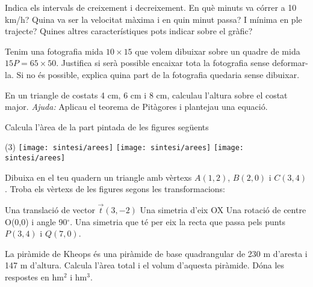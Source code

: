 \begin{mylist}
\begin{tasks}
	\task Indica els intervals de creixement i decreixement.
	\task En què minuts va córrer a 10 km/h?
	\task Quina va ser la velocitat màxima i en quin minut passa? I mínima en ple trajecte?
	\task Quines altres característiques pots indicar sobre el gràfic?
\end{tasks}
	
\exer[2] Tenim una fotografia mida $10 \times 15$ que volem dibuixar sobre un quadre de mida $15P = 65 \times 50$. Justifica si serà possible encaixar tota la fotografia sense deformar-la. Si no és possible, explica quina part de la fotografia quedaria sense dibuixar.
	
	
\exer[2]  En un triangle de costats 4 cm, 6 cm i 8 cm, calculau l'altura sobre el costat major. \textit{Ajuda:} Aplicau el teorema de Pitàgores i plantejau una equació.

\exer[2] Calcula l'àrea de la part pintada de les figures següents
\begin{tasks}(3)
	\task \texttt{[image: sintesi/arees]}
	\task \texttt{[image: sintesi/arees]}
	\task \texttt{[image: sintesi/arees]}
\end{tasks}


\exer[2] Dibuixa en el teu quadern un triangle amb vèrtexs $A(1, 2)$, $B(2, 0)$ i $C(3, 4)$. Troba els vèrtexs de les figures segons les transformacions:
\begin{tasks}
	\task Una translació de vector $\vec t(3,-2)$
	\task Una simetria d'eix OX
	\task Una rotació de centre O(0,0) i angle 90$^\circ$.
	\task Una simetria que té per eix la recta que passa pels punts $P(3, 4)$ i $Q(7, 0)$.
\end{tasks}
\answers[cols=1]{[$A'(4,0)$ $B'(5,-2)$  $C'(6,2)$, $A'(1,-2)$ $B'(2,0)$ $C'(3,-4)$, $A'(-2,1)$ $B'(0,2)$ $C'(-4,3)$, $A'(5,6)$ $B'(7,5)$ $C'(3,4)$]}

\exer[2] La piràmide de Kheops és una piràmide de base quadrangular de 230 m d'aresta i 147 m d'altura. Calcula l'àrea total i el volum d'aquesta piràmide. Dóna les respostes en hm$^2$ i hm$^3$.


\end{mylist}
